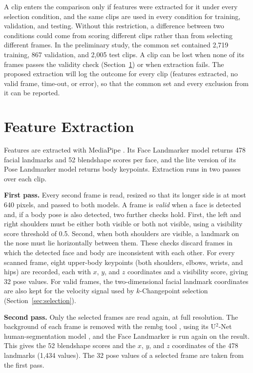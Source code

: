 A clip enters the comparison only if features were extracted for it under every selection condition, and the same clips are used in every condition for training, validation, and testing. Without this restriction, a difference between two conditions could come from scoring different clips rather than from selecting different frames. In the preliminary study, the common set contained 2,719 training, 867 validation, and 2,005 test clips. A clip can be lost when none of its frames passes the validity check (Section~\ref{sec:features}) or when extraction fails. The proposed extraction will log the outcome for every clip (features extracted, no valid frame, time-out, or error), so that the common set and every exclusion from it can be reported.



\section{Feature Extraction}
\label{sec:features}

Features are extracted with MediaPipe \cite{lugaresi2019}. Its Face Landmarker model returns 478 facial landmarks and 52 blendshape scores per face, and the lite version of its Pose Landmarker model returns body keypoints. Extraction runs in two passes over each clip.

\textbf{First pass.} Every second frame is read, resized so that its longer side is at most 640 pixels, and passed to both models. A frame is \emph{valid} when a face is detected and, if a body pose is also detected, two further checks hold. First, the left and right shoulders must be either both visible or both not visible, using a visibility score threshold of 0.5. Second, when both shoulders are visible, a landmark on the nose must lie horizontally between them. These checks discard frames in which the detected face and body are inconsistent with each other. For every scanned frame, eight upper-body keypoints (both shoulders, elbows, wrists, and hips) are recorded, each with $x$, $y$, and $z$ coordinates and a visibility score, giving 32 pose values. For valid frames, the two-dimensional facial landmark coordinates are also kept for the velocity signal used by $k$-Changepoint selection (Section~\ref{sec:selection}).

\textbf{Second pass.} Only the selected frames are read again, at full resolution. The background of each frame is removed with the rembg tool \cite{rembg}, using its U$^2$-Net human-segmentation model \cite{qin2020}, and the Face Landmarker is run again on the result. This gives the 52 blendshape scores and the $x$, $y$, and $z$ coordinates of the 478 landmarks (1,434 values). The 32 pose values of a selected frame are taken from the first pass.

